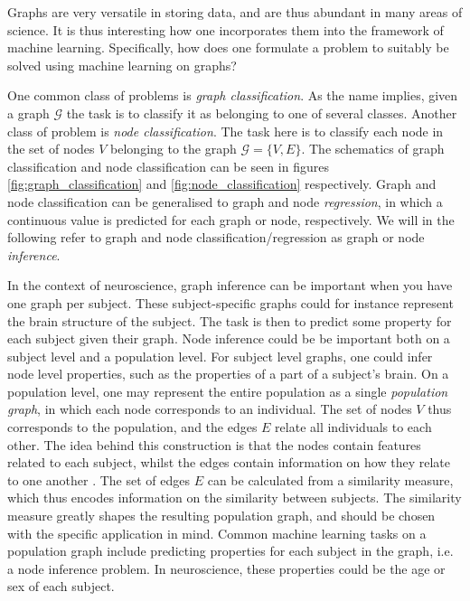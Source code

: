 Graphs are very versatile in storing data, and are thus abundant in many areas of science. It is thus interesting how one incorporates them into the framework of machine learning. Specifically, how does one formulate a problem to suitably be solved using machine learning on graphs? 

One common class of problems is \textit{graph classification}. As the name implies, given a graph $\mathcal{G}$ the task is to classify it as belonging to one of several classes. Another class of problem is \textit{node classification}. The task here is to classify each node in the set of nodes $V$ belonging to the graph $\mathcal{G} = \{V, E \}$. The schematics of graph classification and node classification can be seen in figures \ref{fig:graph_classification} and \ref{fig:node_classification} respectively. Graph and node classification can be generalised to graph and node \textit{regression}, in which a continuous value is predicted for each graph or node, respectively. We will in the following refer to graph and node classification/regression as graph or node \textit{inference}.

In the context of neuroscience, graph inference can be important when you have one graph per subject. These subject-specific graphs could for instance represent the brain structure of the subject. The task is then to predict some property for each subject given their graph. Node inference could be be important both on a subject level and a population level. For subject level graphs, one could infer node level properties, such as the properties of a part of a subject's brain. On a population level, one may represent the entire population as a single \textit{population graph}, in which each node corresponds to an individual. The set of nodes $V$ thus corresponds to the population, and the edges $E$ relate all individuals to each other. The idea behind this construction is that the nodes contain features related to each subject, whilst the edges contain information on how they relate to one another \cite{stankeviciute}. The set of edges $E$ can be calculated from a similarity measure, which thus encodes information on the similarity between subjects. The similarity measure greatly shapes the resulting population graph, and should be chosen with the specific application in mind. Common machine learning tasks on a population graph include predicting properties for each subject in the graph, i.e. a node inference problem. In neuroscience, these properties could be the age or sex of each subject.  

